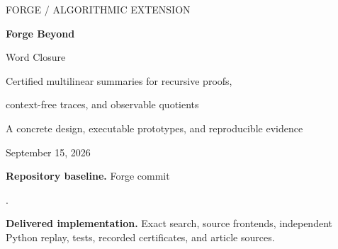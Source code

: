 \documentclass[11pt,letterpaper]{article}
\theoremstyle{definition}\newtheorem{definition}[theorem]{Definition}
\theoremstyle{remark}\newtheorem{remark}[theorem]{Remark}
\newcommand{\code}[1]{\texttt{\detokenize{#1}}}
\begin{document}
\hypersetup{pageanchor=false}
\begin{titlepage}
\vspace*{0.6in}
{\large\sffamily FORGE / ALGORITHMIC EXTENSION\par}
\vspace{0.25in}
{\Huge\bfseries Forge Beyond\par Word Closure\par}
\vspace{0.25in}
{\Large Certified multilinear summaries for recursive proofs,\par context-free traces, and observable quotients\par}
\vspace{0.35in}
{\large A concrete design, executable prototypes, and reproducible evidence\par}
\vspace{0.3in}
September 15, 2026
\vspace{0.4in}
\begin{abstract}
Forge already has substantial proposals for structural proof search, algebraic certificates, word-observation closure, and finite-algebra covers. This article adds a specific algorithmic layer rather than another general architecture: an exact, many-sorted \emph{multilinear reachable-span} worker. It computes finite certificates for recursive definitions with several independently recursive children, even when their rational-valued summaries take infinitely many values. A matrix-valued grammar compiler extends the same worker to context-free restrictions on execution traces. A second closure, generated by one-hole contexts, constructs exact observable quotients and verifies them through finite commuting diagrams.

The package implements these algorithms in standard-library Python, a multi-affine source frontend, an independently organized checker, and compressed derivation witnesses. Recorded evidence includes 240 exhaustive finite-language differential cases, 40 quotient certificates, 20 deliberately invalid objects rejected, and eight replayed fixtures. A 61-node witness represents a word of length $2^{60}$; a noisy five-coordinate tree summary reduces to two observable coordinates. The mathematical foundation is established multiplicity-tree-automata theory, adapted here to Forge's certificate interface. No new general automata theorem, implemented Lean tactic, Lean-kernel validation, or performance comparison with \code{grind} is claimed. One hand-written Lean integration specimen is included and explicitly uncompiled.
\end{abstract}
\vfill
\small
\textbf{Repository baseline.} Forge commit\par
{}.\par
\textbf{Delivered implementation.} Exact search, source frontends, independent Python replay, tests, recorded certificates, and article sources.\par
\end{titlepage}
\hypersetup{pageanchor=true}
\tableofcontents
\newpage
{}
\end{document}

